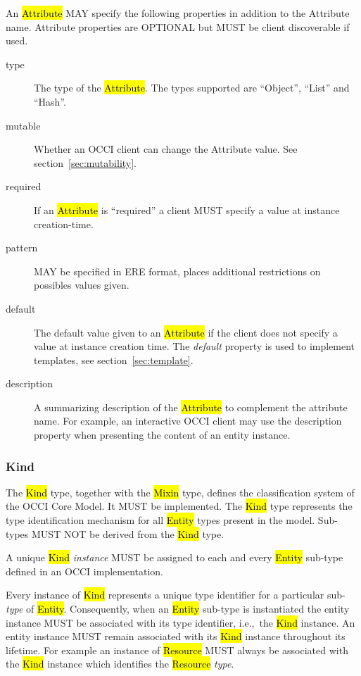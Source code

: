 \documentclass[10pt,a4paper]{article}
\begin{document}
An \hl{Attribute} MAY specify the following properties in addition to the
Attribute name. Attribute properties are OPTIONAL but MUST be client
discoverable if used.
\begin{description}
\item[type] The type of the \hl{Attribute}. The types supported are ``Object'', ``List'' and ``Hash''.

\item[mutable] Whether an OCCI client can change the Attribute value. See
  section~\ref{sec:mutability}.

\item[required] If an \hl{Attribute} is ``required'' a client MUST specify a
  value at instance creation-time.

\item[pattern] MAY be specified in ERE \cite{ere} format, places additional restrictions on possibles values given.

\item[default] The default value given to an \hl{Attribute} if the client does
  not specify a value at instance creation time.  The {\em default} property is used to implement templates, see section~\ref{sec:template}.

\item[description] A summarizing description of the \hl{Attribute} to
  complement the attribute name. For example, an interactive OCCI client may
  use the description property when presenting the content of an entity
  instance.
\end{description}


\subsubsection{Kind}
\label{sec:kind}

The \hl{Kind} type, together with the \hl{Mixin} type, defines the
classification system of the OCCI Core Model. It MUST be
implemented. The \hl{Kind} type represents the type identification
mechanism for all \hl{Entity} types present in the model.
%
Sub-types MUST NOT be derived from the \hl{Kind} type.

A unique \hl{Kind} {\em instance} MUST be assigned to each and every
\hl{Entity} sub-type defined in an OCCI implementation.

Every instance of \hl{Kind} represents a unique type identifier for a
particular sub-{\em type} of \hl{Entity}.  Consequently, when an \hl{Entity}
sub-type is instantiated the entity instance MUST be associated with
its type identifier, i.e.,~the \hl{Kind} instance.  An entity instance
MUST remain associated with its \hl{Kind} instance throughout its
lifetime.
%
For example an instance of \hl{Resource} MUST always be associated
with the \hl{Kind} instance which identifies the \hl{Resource} {\em type}.
\end{document}
